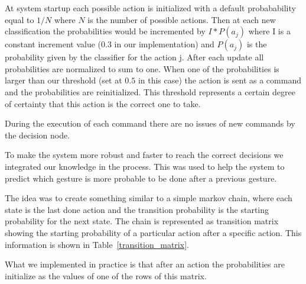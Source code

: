 At system startup each possible action is initialized with a default probabability equal to $1/N$ where $N$ is the number of possible actions.
Then at each new classification the probabilities would be incremented by $I*P(a_j)$ where I is a constant increment value ($0.3$ in our implementation) and $P(a_j)$ is the probability given by the classifier for the action j.
After each update all probabilities are normalized to sum to one.
When one of the probabilities is larger than our threshold (set at $0.5$ in this case) the action is sent as a command and the probabilities are reinitialized. This threshold represents a certain degree of certainty that this action is the correct one to take.

During the execution of each command there are no issues of new commands by the decision node.

To make the system more robust and faster to reach the correct decisions we integrated our knowledge in the process. This was used to help the system to predict which gesture is more probable to be done after a previous gesture.

The idea was to create something similar to a simple markov chain, where each state is the last done action and the transition
probability is the starting probability for the next state.
The chain is represented as transition matrix showing the starting probability of a particular action after a specific action. This information is shown in Table~\ref{transition_matrix}.


What we implemented in practice is that after an action the probabilities are initialize as the values of one of the rows of this matrix.
